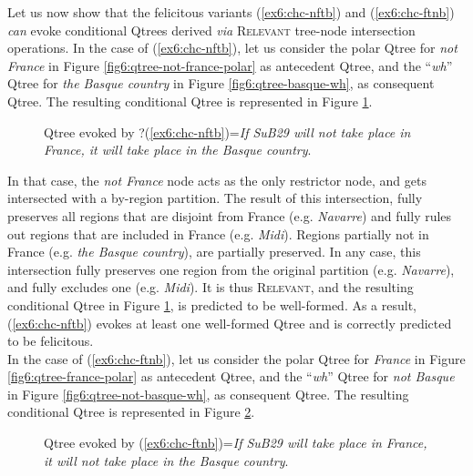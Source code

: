 Let us now show that the felicitous variants (\ref{ex6:chc-nftb}) and (\ref{ex6:chc-ftnb}) \textit{can} evoke conditional Qtrees derived \textit{via} \textsc{Relevant} tree-node intersection operations. In the case of (\ref{ex6:chc-nftb}), let us consider the polar Qtree for \textit{not France} in Figure \ref{fig6:qtree-not-france-polar} as antecedent Qtree, and the ``\textit{wh}'' Qtree for \textit{the Basque country} in Figure \ref{fig6:qtree-basque-wh}, as consequent Qtree. The resulting conditional Qtree is represented in Figure \ref{fig6:qtree-chc-nftb}. 

\begin{figure}[H]
	\centering
	\caption[]{Qtree evoked by ?(\ref{ex6:chc-nftb})=\textit{If SuB29 will not take place in France, it will take place in the Basque country}.}\label{fig6:qtree-chc-nftb}
\end{figure}

In that case, the \textit{not France} node acts as the only restrictor node, and gets intersected with a by-region partition. The result of this intersection, fully preserves all regions that are disjoint from France (e.g. \textit{Navarre}) and fully rules out regions that are included in France (e.g. \textit{Midi}). Regions partially not in France (e.g. \textit{the Basque country}), are partially preserved. In any case, this intersection fully preserves one region from the original partition (e.g. \textit{Navarre}), and fully excludes one (e.g. \textit{Midi}). It is thus \textsc{Relevant}, and the resulting conditional Qtree in Figure \ref{fig6:qtree-chc-nftb}, is predicted to be well-formed. As a result, (\ref{ex6:chc-nftb}) evokes at least one well-formed Qtree and is correctly predicted to be felicitous. \\


In the case of (\ref{ex6:chc-ftnb}), let us consider the polar Qtree for \textit{France} in Figure \ref{fig6:qtree-france-polar} as antecedent Qtree, and the ``\textit{wh}'' Qtree for \textit{not Basque} in Figure \ref{fig6:qtree-not-basque-wh}, as consequent Qtree. The resulting conditional Qtree is represented in Figure \ref{fig6:qtree-chc-ftnb}. 

\begin{figure}[H]
	\centering
	\caption[]{Qtree evoked by (\ref{ex6:chc-ftnb})=\textit{If SuB29 will take place in France, it will not take place in the Basque country}.}\label{fig6:qtree-chc-ftnb}
\end{figure}

